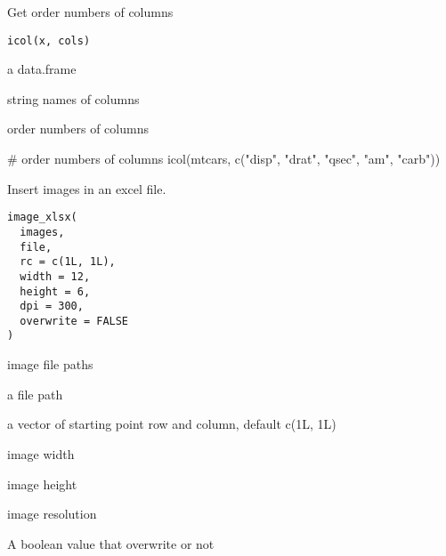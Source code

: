 \documentclass[letterpaper]{book}
\begin{document}
%
\begin{Description}
Get order numbers of columns
\end{Description}
%
\begin{Usage}
\begin{verbatim}
icol(x, cols)
\end{verbatim}
\end{Usage}
%
\begin{Arguments}
\begin{ldescription}
\item[\code{x}] a data.frame

\item[\code{cols}] string names of columns
\end{ldescription}
\end{Arguments}
%
\begin{Value}
order numbers of columns
\end{Value}
%
\begin{Examples}
\begin{ExampleCode}
# order numbers of columns
icol(mtcars, c("disp", "drat", "qsec", "am", "carb"))

\end{ExampleCode}
\end{Examples}
%
\begin{Description}
Insert images in an excel file.
\end{Description}
%
\begin{Usage}
\begin{verbatim}
image_xlsx(
  images,
  file,
  rc = c(1L, 1L),
  width = 12,
  height = 6,
  dpi = 300,
  overwrite = FALSE
)
\end{verbatim}
\end{Usage}
%
\begin{Arguments}
\begin{ldescription}
\item[\code{images}] image file paths

\item[\code{file}] a file path

\item[\code{rc}] a vector of starting point row and column, default c(1L, 1L)

\item[\code{width}] image width

\item[\code{height}] image height

\item[\code{dpi}] image resolution

\item[\code{overwrite}] A boolean value that overwrite or not
\end{ldescription}
\end{Arguments}
\end{document}
